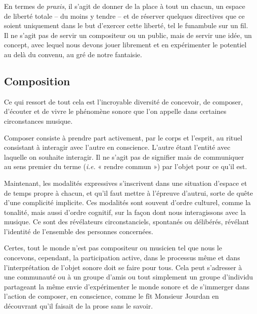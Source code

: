 \bigskip

En termes de \textit{praxis}, il s’agit de donner de la place à tout un chacun, un espace de liberté totale -- du moins y tendre -- et de réserver quelques directives que ce soient uniquement dans le but d’exercer cette liberté, tel le funambule sur un fil. Il ne s’agit pas de servir un compositeur ou un public, mais de servir une idée, un concept, avec lequel nous devons jouer librement et en expérimenter le potentiel au delà du convenu, au gré de notre fantaisie.

\subsection*{Composition} 
\label{composition}

Ce qui ressort de tout cela est l'incroyable diversité de concevoir, de composer, d'écouter et de vivre le phénomène sonore que l'on appelle dans certaines circonstances musique.

Composer consiste à prendre part activement, par le corps et l'esprit, au rituel consistant à interagir avec l'autre en conscience. L'autre étant l'entité avec laquelle on souhaite interagir. Il ne s'agit pas de signifier mais de communiquer au sens premier du terme 
(\textit{i.e.} « rendre commun »)
par l'objet pour ce qu'il est. 

Maintenant, les modalités expressives s'inscrivent dans une situation  d'espace et de temps propre à chacun, et qu'il faut mettre à l'épreuve d'autrui, sorte de quête d'une complicité implicite. Ces modalités sont souvent d'ordre culturel, comme la tonalité, mais aussi d'ordre cognitif, sur la façon dont nous interagissons avec la musique. Ce sont des révélateurs circonstanciels, spontanés ou délibérés, révélant l'identité de l'ensemble des personnes concernées. 

Certes, tout le monde n’est pas compositeur ou musicien tel que nous le concevons, cependant, la participation active, dans le processus même et dans l’interprétation de l’objet sonore doit se faire pour tous. 
Cela peut s'adresser à une communauté ou à un groupe d'amis ou tout simplement un groupe d'individu partageant la même envie d'expérimenter le monde sonore et de s'immerger dans l'action de composer,
en conscience, comme le fît  Monsieur Jourdan en découvrant qu'il faisait de la prose sans le savoir.


